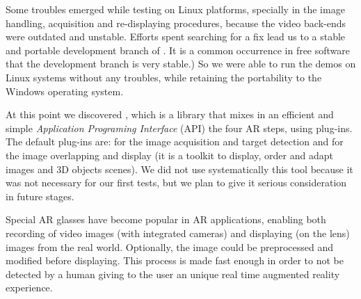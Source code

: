 Some troubles emerged while testing \ARtoolkit on Linux platforms,
specially in the image handling, acquisition and re\hyp{}displaying
procedures, because the video back\hyp{}ends were outdated and
unstable. Efforts spent searching for a fix lead us to a stable and
portable development branch of \ARtoolkit. It is a common occurrence
in free software that the development branch is very stable.) So we
were able to run the demos on Linux systems without any troubles,
while retaining the portability to the Windows operating system.

At this point we discovered \Osgart, which is a library that mixes in
an efficient and simple \emph{Application Programing Interface} (API)
the four AR steps, using plug\hyp{}ins. The default \Osgart
plug\hyp{}ins are: \ARtoolkit for the image acquisition and target
detection and \Openscenegraph for the image overlapping and display
(it is a toolkit to display, order and adapt images and 3D objects
scenes). We did not use systematically this tool because it was not
necessary for our first tests, but we plan to give it serious
consideration in future stages.

Special AR glasses have become popular in AR applications, enabling
both recording of video images (with integrated cameras) and
displaying (on the lens) images from the real world. Optionally, the
image could be preprocessed and modified before displaying. This
process is made fast enough in order to not be detected by a human
giving to the user an unique real time augmented reality experience.
